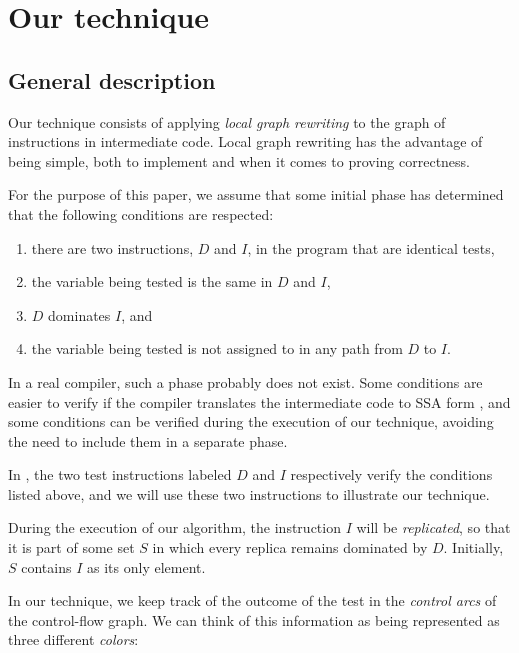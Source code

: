 \section{Our technique}

\subsection{General description}

Our technique consists of applying \emph{local graph rewriting} to the
graph of instructions in intermediate code.  Local graph rewriting has
the advantage of being simple, both to implement and when it comes to
proving correctness.

For the purpose of this paper, we assume that some initial phase has
determined that the following conditions are respected:

\begin{enumerate}
\item there are two instructions, $D$ and $I$, in the program that
  are identical tests,
\item the variable being tested is the same in $D$ and $I$,
\item $D$ dominates $I$, and
\item the variable being tested is not assigned to in any path from
  $D$ to $I$.
\end{enumerate}

In a real compiler, such a phase probably does not exist.  Some
conditions are easier to verify if the compiler translates the
intermediate code to SSA form \cite{Cytron:1989:EMC:75277.75280,
  Cytron:1991:ECS:115372.115320}, and some conditions can be verified
during the execution of our technique, avoiding the need to include
them in a separate phase.

In , the two test instructions labeled $D$
and $I$ respectively verify the conditions listed above, and we will
use these two instructions to illustrate our technique.

During the execution of our algorithm, the instruction $I$ will be
\emph{replicated}, so that it is part of some set $S$ in which every
replica remains dominated by $D$.  Initially, $S$ contains $I$ as its
only element.

In our technique, we keep track of the outcome of the test in the
\emph{control arcs} of the control-flow graph.  We can think of this
information as being represented as three different \emph{colors}:

